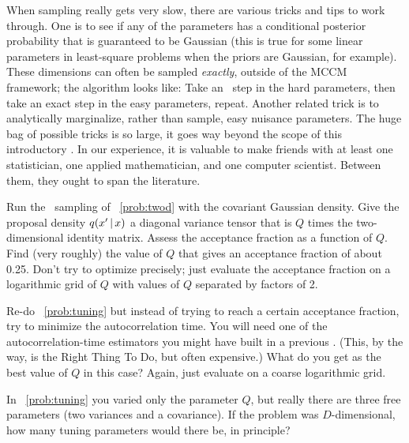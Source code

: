 \documentclass[12pt,twoside,pdftex]{article}
\newcommand{\MCMC}{\acronym{MCMC}}
\begin{document}
When sampling really gets very slow,
  there are various tricks and tips to work through.
One is to see if any of the parameters has a conditional posterior
  probability that is guaranteed to be Gaussian
  (this is true for some linear parameters in least-square problems
  when the priors are Gaussian, for example).
These dimensions can often be sampled \emph{exactly},
  outside of the MCCM framework;
  the algorithm looks like:
Take an \MCMC\ step in the hard parameters,
  then take an exact step in the easy parameters,
  repeat.
Another related trick is to analytically marginalize,
  rather than sample,
  easy nuisance parameters.
The huge bag of possible tricks is so large,
  it goes way beyond the scope of this introductory \documentname.
In our experience, it is valuable to make friends with at least one statistician,
  one applied mathematician, and one computer scientist.
Between them, they ought to span the literature.

\begin{problem}\label{prob:tuning}
Run the \MCMC\ sampling of \problemname~\ref{prob:twod} with the
covariant Gaussian density.
Give the proposal density $q(x'\,|\, x)$ a diagonal variance
tensor that is $Q$ times the two-dimensional identity matrix.
Assess the acceptance fraction as a function of $Q$.
Find (very roughly) the value of $Q$ that gives an acceptance
fraction of about 0.25.
Don't try to optimize precisely; just evaluate the acceptance fraction
on a logarithmic grid of $Q$ with values of $Q$ separated by factors
of 2.
\end{problem}

\begin{problem}
Re-do \problemname~\ref{prob:tuning} but instead of trying to reach a
certain acceptance fraction, try to minimize the autocorrelation time.
You will need one of the autocorrelation-time estimators you might have
built in a previous \problemname.
(This, by the way, is the Right Thing To Do, but often expensive.)
What do you get as the best value of $Q$ in this case?
Again, just evaluate on a coarse logarithmic grid.
\end{problem}

\begin{problem}
In \problemname~\ref{prob:tuning} you varied only the parameter $Q$, but
really there are three free parameters (two variances and a covariance).
If the problem was $D$-dimensional, how many tuning parameters would there
be, in principle?
\end{problem}
\end{document}
